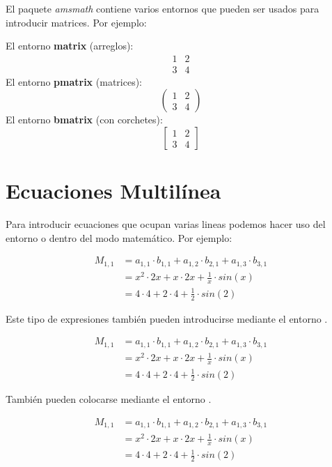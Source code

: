 \documentclass[letterpaper,12pt]{book}
\begin{document}
El paquete \emph{amsmath} contiene varios entornos que pueden ser usados para introducir matrices. Por ejemplo:

El entorno \textbf{matrix} (arreglos):
\[
\begin{matrix}
	1 & 2 \\
	3 & 4
\end{matrix}
\]
El entorno \textbf{pmatrix} (matrices):
\[
\begin{pmatrix}
	1 & 2 \\
	3 & 4
\end{pmatrix}
\]
El entorno \textbf{bmatrix} (con corchetes):
\[
\begin{bmatrix}
	1 & 2 \\
	3 & 4
\end{bmatrix}
\]

\pagebreak

\section{Ecuaciones Multilínea}

Para introducir ecuaciones que ocupan varias lineas podemos hacer uso del entorno \verb@aligned@ o 
\verb@split@ dentro del modo matemático. Por ejemplo:

\[
\begin{aligned}
	M_{1,1} &= a_{1,1} \cdot b_{1,1} + a_{1,2} \cdot b_{2,1} + a_{1,3} \cdot b_{3,1} \\
			&= x^2 \cdot 2x + x \cdot 2x + \frac{1}{x} \cdot sin(x) \\
			&= 4 \cdot 4 + 2 \cdot 4 + \frac{1}{2} \cdot sin(2) 
\end{aligned}
\]

Este tipo de expresiones también pueden introducirse mediante el entorno \verb@equation@.

\begin{equation*}
\begin{aligned}
	M_{1,1} &= a_{1,1} \cdot b_{1,1} + a_{1,2} \cdot b_{2,1} + a_{1,3} \cdot b_{3,1} \\
			&= x^2 \cdot 2x + x \cdot 2x + \frac{1}{x} \cdot sin(x) \\
			&= 4 \cdot 4 + 2 \cdot 4 + \frac{1}{2} \cdot sin(2) 
\end{aligned}
\end{equation*}

También pueden colocarse mediante el entorno \verb@align@.

\begin{align*}
	M_{1,1} &= a_{1,1} \cdot b_{1,1} + a_{1,2} \cdot b_{2,1} + a_{1,3} \cdot b_{3,1} \\
			&= x^2 \cdot 2x + x \cdot 2x + \frac{1}{x} \cdot sin(x) \\
			&= 4 \cdot 4 + 2 \cdot 4 + \frac{1}{2} \cdot sin(2) 
\end{align*}
\end{document}
